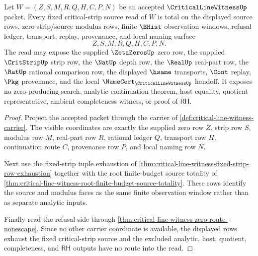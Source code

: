 \begin{theorem}
\label{thm:critical-line-witness-fixed-strip-source-totality}
Let $W=(Z,S,M,R,Q,H,C,P,N)$ be an accepted $\CriticalLineWitnessUp$ packet.
Every fixed critical-strip source read of $W$ is total on the displayed
source rows, zero-strip/source modulus rows, finite $\BHist$ observation
windows, refusal ledger, transport, replay, provenance, and local naming
surface
$$
Z,S,M,R,Q,H,C,P,N.
$$
The read may expose the supplied $\ZetaZerosUp$ zero row, the supplied
$\CritStripUp$ strip row, the $\NatUp$ depth row, the $\RealUp$ real-part row,
the $\RatUp$ rational comparison row, the displayed $\hsame$ transports,
$\Cont$ replay, $\Pkg$ provenance, and the local
$\NameCert_{\CriticalLineWitnessUp}$ handoff. It exposes no zero-producing
search, analytic-continuation theorem, host equality, quotient
representative, ambient completeness witness, or proof of $\mathsf{RH}$.
\end{theorem}
\begin{proof}
Project the accepted packet through the carrier of
\autoref{def:critical-line-witness-carrier}. The visible coordinates are
exactly the supplied zero row $Z$, strip row $S$, modulus row $M$, real-part
row $R$, rational ledger $Q$, transport row $H$, continuation route $C$,
provenance row $P$, and local naming row $N$.

Next use the fixed-strip tuple exhaustion of
\autoref{thm:critical-line-witness-fixed-strip-row-exhaustion} together with
the root finite-budget source totality of
\autoref{thm:critical-line-witness-root-finite-budget-source-totality}. These
rows identify the source and modulus faces as the same finite observation
window rather than as separate analytic inputs.

Finally read the refusal side through
\autoref{thm:critical-line-witness-zero-route-nonescape}. Since no other
carrier coordinate is available, the displayed rows exhaust the fixed
critical-strip source and the excluded analytic, host, quotient, completeness,
and $\mathsf{RH}$ outputs have no route into the read.
\end{proof}

